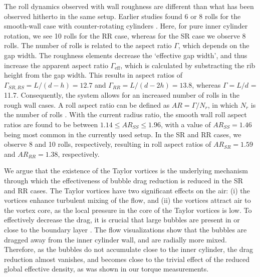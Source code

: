 \documentclass{jfm}
\begin{document}
The roll dynamics observed with wall roughness are different than what has been observed hitherto in the same setup. Earlier studies found  6 or 8 rolls for the smooth-wall case with  counter-rotating cylinders \citep{hui14,vee16b}. Here, for pure inner cylinder rotation, we see 10 rolls for the RR case, whereas for the SR case we observe 8 rolls.
The number of rolls is related to the aspect ratio $\Gamma$, which depends on the gap width. The roughness elements decrease the `effective gap width', and thus increase the apparent aspect ratio $\Gamma_{\text{eff}}$, which is calculated by substracting the rib height from the gap width. This results in aspect ratios of $\Gamma_{SR,RS}=L/(d - h) =12.7$ and $\Gamma_{RR}=L/(d-2h)= 13.8$, whereas $\Gamma = L/d$ = 11.7. Consequently, the system allows for an increased number of rolls in the rough wall cases. A roll aspect ratio can be defined as $AR=\Gamma/N_r$, in which $N_r$ is the number of rolls \cite{hui14,vee16b,cho14}.  With the current radius ratio, the smooth wall roll aspect ratios are found to be between $1.14 \leq AR_{SS} \leq 1.96$, with a value of $AR_{SS}=1.46$ being most common in the currently used setup. In the SR and RR cases, we observe 8 and 10 rolls, respectively, resulting in roll aspect ratios of $AR_{SR} = 1.59$ and $AR_{RR}=1.38$, respectively. 

We argue that the existence of the Taylor vortices is the underlying mechanism through which the effectiveness of bubble drag reduction is reduced in the SR and RR cases. The Taylor vortices have two significant effects on the air: (i) the vortices enhance turbulent mixing of the flow, and (ii) the vortices attract air to the vortex core, as the local pressure in the core of the Taylor vortices is low. To effectively decrease the drag, it is crucial that large bubbles are present in or close to the boundary layer \citep{gil13,ver16,spa17}. The flow visualizations show that the bubbles are dragged away from the inner cylinder wall, and are radially more mixed. Therefore, as the bubbles do not accumulate close to the inner cylinder, the drag reduction almost vanishes, and becomes close to the trivial effect of the reduced global effective density, as was shown in our torque measurements.
\end{document}
